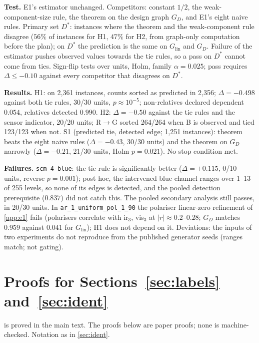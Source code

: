 \textbf{Test.} E1's estimator unchanged. Competitors: constant $1/2$, the
weak-component-size rule, the theorem on the design graph $G_D$, and E1's
eight naive rules. Primary set $D^*$: instances where the theorem and the
weak-component rule disagree ($56\%$ of instances for H1, $47\%$ for H2, from
graph-only computation before the plan); on $D^*$ the prediction is the same
on $G_{\mathrm{lin}}$ and $G_D$. Failure of the estimator pushes observed values
towards the tie rules, so a pass on $D^*$ cannot come from ties. Sign-flip
tests over units, Holm, family $\alpha=0.025$; pass requires $\Delta\le-0.10$
against every competitor that disagrees on $D^*$.

\textbf{Results.} H1: on 2{,}361 instances, counts sorted as predicted in
2{,}356; $\Delta=-0.498$ against both tie rules, 30/30 units, $p\approx10^{-5}$;
non-relatives declared dependent $0.054$, relatives detected $0.990$. H2:
$\Delta=-0.50$ against the tie rules and the sensor indicator, 20/20 units;
R$\to$G sorted 264/264 when B is observed and tied 123/123 when not. S1
(predicted tie, detected edge; 1{,}251 instances): theorem beats the eight
naive rules ($\Delta=-0.43$, 30/30 units) and the theorem on $G_D$ narrowly
($\Delta=-0.21$, 21/30 units, Holm $p=0.021$). No stop condition met.

\textbf{Failures.} \texttt{scm\_4\_blue}: the tie rule is significantly better
($\Delta=+0.115$, 0/10 units, reverse $p=0.001$); post hoc, the intervened blue
channel ranges over 1--13 of 255 levels, so none of its edges is detected, and
the pooled detection prerequisite ($0.837$) did not catch this. The pooled
secondary analysis still passes, in 20/30 units. In
\texttt{ar\_1\_uniform\_pol\_1\_90} the polariser linear-zero refinement of
\cref{app:e1} fails (polarisers correlate with ir$_3$, vis$_3$ at
$|r|\approx0.2$--$0.28$; $G_D$ matches $0.959$ against $0.041$ for
$G_{\mathrm{lin}}$); H1 does not depend on it. Deviations: the inputs of two
experiments do not reproduce from the published generator seeds (ranges
match; not gating).


\section{Proofs for Sections~\ref{sec:labels} and~\ref{sec:ident}}
\label{app:ident}

 is proved in the main text. The proofs below are paper
proofs; none is machine-checked. Notation as in \cref{sec:ident}.

